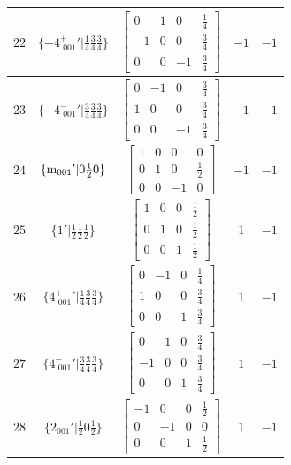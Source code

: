 \documentclass[fleqn,8pt]{jsarticle}
\begin{document}
\begin{longtable}{ccccc}
$ 22 $ & $ \{-4^{+}_{\,\,001}{}'|\frac{1}{4} \frac{3}{4} \frac{3}{4}\} $ & $ \begin{bmatrix} 0 & 1 & 0 & \frac{1}{4} \\ -1 & 0 & 0 & \frac{3}{4} \\ 0 & 0 & -1 & \frac{3}{4} \end{bmatrix} $ & $ -1 $ & $ -1 $ \\ \hline
$ 23 $ & $ \{-4^{-}_{\,\,001}{}'|\frac{3}{4} \frac{3}{4} \frac{3}{4}\} $ & $ \begin{bmatrix} 0 & -1 & 0 & \frac{3}{4} \\ 1 & 0 & 0 & \frac{3}{4} \\ 0 & 0 & -1 & \frac{3}{4} \end{bmatrix} $ & $ -1 $ & $ -1 $ \\ \hline
$ 24 $ & $ \{{\rm m}_{001}{}'|0 \frac{1}{2} 0\} $ & $ \begin{bmatrix} 1 & 0 & 0 & 0 \\ 0 & 1 & 0 & \frac{1}{2} \\ 0 & 0 & -1 & 0 \end{bmatrix} $ & $ -1 $ & $ -1 $ \\ \hline
$ 25 $ & $ \{1{}'|\frac{1}{2} \frac{1}{2} \frac{1}{2}\} $ & $ \begin{bmatrix} 1 & 0 & 0 & \frac{1}{2} \\ 0 & 1 & 0 & \frac{1}{2} \\ 0 & 0 & 1 & \frac{1}{2} \end{bmatrix} $ & $ 1 $ & $ -1 $ \\ \hline
$ 26 $ & $ \{4^{+}_{\,\,001}{}'|\frac{1}{4} \frac{3}{4} \frac{3}{4}\} $ & $ \begin{bmatrix} 0 & -1 & 0 & \frac{1}{4} \\ 1 & 0 & 0 & \frac{3}{4} \\ 0 & 0 & 1 & \frac{3}{4} \end{bmatrix} $ & $ 1 $ & $ -1 $ \\ \hline
$ 27 $ & $ \{4^{-}_{\,\,001}{}'|\frac{3}{4} \frac{3}{4} \frac{3}{4}\} $ & $ \begin{bmatrix} 0 & 1 & 0 & \frac{3}{4} \\ -1 & 0 & 0 & \frac{3}{4} \\ 0 & 0 & 1 & \frac{3}{4} \end{bmatrix} $ & $ 1 $ & $ -1 $ \\ \hline
$ 28 $ & $ \{2{}_{001}{}'|\frac{1}{2} 0 \frac{1}{2}\} $ & $ \begin{bmatrix} -1 & 0 & 0 & \frac{1}{2} \\ 0 & -1 & 0 & 0 \\ 0 & 0 & 1 & \frac{1}{2} \end{bmatrix} $ & $ 1 $ & $ -1 $ \\ \hline

\end{longtable}
\end{document}
